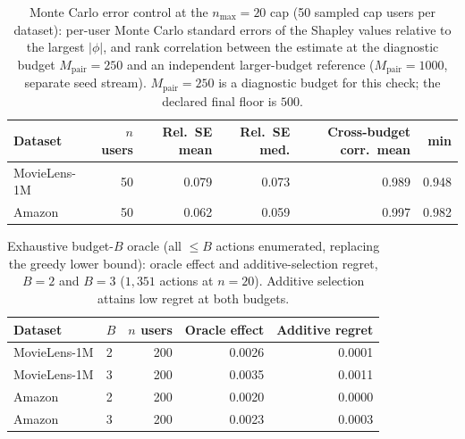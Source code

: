 \begin{table}[t]\centering\scriptsize\setlength{\tabcolsep}{3pt}
\caption{Monte Carlo error control at the $n_{\max}=20$ cap (50 sampled
cap users per dataset): per-user Monte Carlo standard errors of the Shapley
values relative to the largest $|\phi|$, and rank correlation between the
estimate at the diagnostic budget $M_{\mathrm{pair}}=250$ and an independent
larger-budget reference ($M_{\mathrm{pair}}=1000$, separate seed stream).
$M_{\mathrm{pair}}=250$ is a diagnostic budget for this check; the declared
final floor is $500$.}
\label{tab:review8-mcse}
\begin{tabular}{@{}lrrrrr@{}}
\toprule
Dataset & $n$ users & Rel.\ SE mean & Rel.\ SE med. & Cross-budget corr.\ mean & min \\
\midrule
MovieLens-1M & 50 & 0.079 & 0.073 & 0.989 & 0.948 \\
Amazon & 50 & 0.062 & 0.059 & 0.997 & 0.982 \\
\bottomrule\end{tabular}\end{table}
\begin{table}[t]\centering\scriptsize\setlength{\tabcolsep}{3pt}
\caption{Exhaustive budget-$B$ oracle (all $\le B$ actions enumerated, replacing
the greedy lower bound): oracle effect and additive-selection regret, $B=2$
and $B=3$ ($1{,}351$ actions at $n=20$). Additive selection attains low regret
at both budgets.}
\label{tab:review8-b3}
\begin{tabular}{@{}llrrr@{}}
\toprule
Dataset & $B$ & $n$ users & Oracle effect & Additive regret \\
\midrule
MovieLens-1M & 2 & 200 & 0.0026 & 0.0001 \\
MovieLens-1M & 3 & 200 & 0.0035 & 0.0011 \\
Amazon & 2 & 200 & 0.0020 & 0.0000 \\
Amazon & 3 & 200 & 0.0023 & 0.0003 \\
\bottomrule\end{tabular}\end{table}
